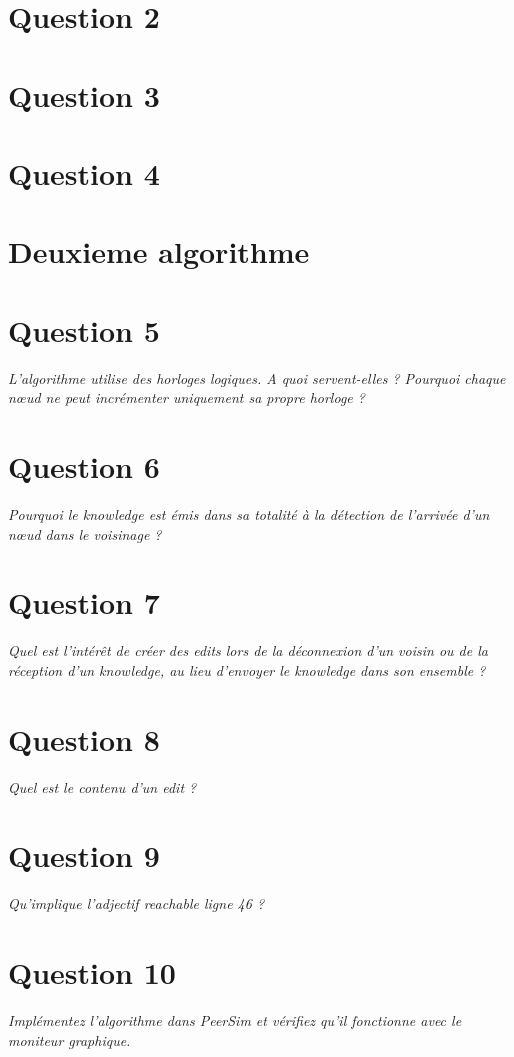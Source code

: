 \documentclass[11pt,a4paper,sans]{report}
\begin{document}
	\section{Question 2}

	\section{Question 3}

	\section{Question 4}

	\section*{Deuxieme algorithme}

	\section{Question 5}
	\textit{L’algorithme utilise des horloges logiques. A quoi servent-elles ?  Pourquoi chaque nœud ne peut incrémenter uniquement sa propre horloge ?}
	\section{Question 6}
	\textit{Pourquoi le knowledge est émis dans sa totalité à la détection de l’arrivée d’un nœud dans le voisinage ?}
	\section{Question 7}
	\textit{Quel est l’intérêt de créer des edits lors de la déconnexion d’un voisin ou de la réception d’un knowledge, au lieu d’envoyer le knowledge dans son ensemble ?}
	\section{Question 8}
	\textit{Quel est le contenu d’un edit ?}
	\section{Question 9}
	\textit{Qu’implique l’adjectif reachable ligne 46 ?}
	\section{Question 10}
	\textit{Implémentez l’algorithme dans PeerSim et vérifiez qu’il fonctionne avec le moniteur graphique.}
\end{document}
